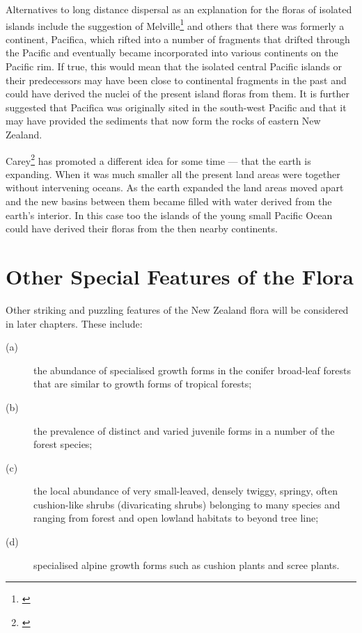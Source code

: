 Alternatives to long distance dispersal as an explanation for the floras of isolated islands include the suggestion of Melville\footnote{\cite{melville1981vicarious}} and others that there was formerly a continent, Pacifica, which rifted into a number of fragments that drifted through the Pacific and eventually became incorporated into various continents on the Pacific rim.
If true, this would mean that the isolated central Pacific islands or their predecessors may have been close to continental fragments in the past and could have derived the nuclei of the present island floras from them.
It is further suggested that Pacifica was originally sited in the south-west Pacific and that it may have provided the sediments that now form the rocks of eastern New Zealand.

Carey\footnote{\cite{carey1983necessity}} has promoted a different idea for some time --- that the earth is expanding.
When it was much smaller all the present land areas were together without intervening oceans.
As the earth expanded the land areas moved apart and the new basins between them became filled with water derived from the earth's interior.
In this case too the islands of the young small Pacific Ocean could have derived their floras from the then nearby continents.

\section{Other Special Features of the Flora}

Other striking and puzzling features of the New Zealand flora will be considered in later chapters.
These include:

\begin{description}
\item[{(a)}]the abundance of specialised growth forms in the conifer broad-leaf forests that are similar to growth forms of tropical forests;
\item[{(b)}]the prevalence of distinct and varied juvenile forms in a number of the forest species;
\item[{(c)}]the local abundance of very small-leaved, densely twiggy, springy, often cushion-like shrubs (divaricating shrubs) belonging to many species and ranging from forest and open lowland habitats to beyond tree line;
\item[{(d)}]specialised alpine growth forms such as cushion plants and scree plants.
\end{description}

